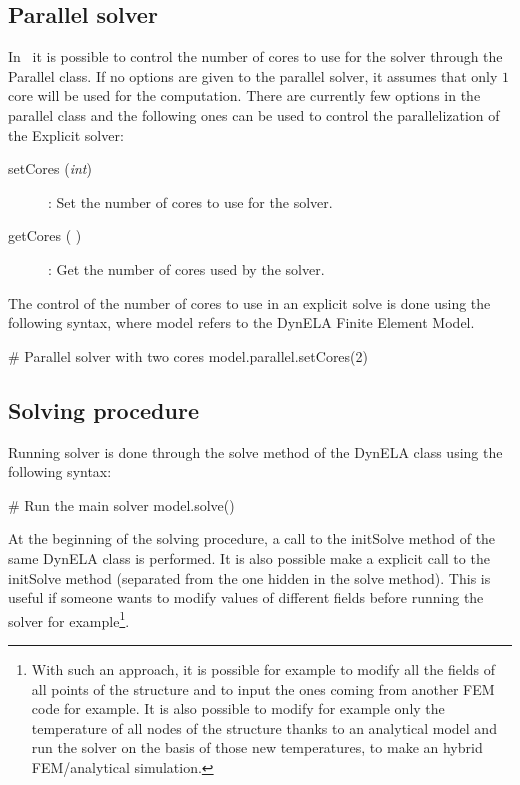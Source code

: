 \subsection{Parallel solver}
In \DynELA~it is possible to control the number of cores to use for the solver through the \textsf{Parallel} class. If no options are given to the parallel solver, it assumes that only $1$ core will be used for the computation. There are currently few options in the parallel class and the following ones can be used to control the parallelization of the Explicit solver:
\begin{description}
\item [{setCores (\emph{int})}] : Set the number of cores to use for the solver.
\item [{getCores ( )}] : Get the number of cores used by the solver.
\end{description}
The control of the number of cores to use in an explicit solve is done using the following syntax, where \textsf{model} refers to the DynELA Finite Element Model.
\begin{PythonListing}
# Parallel solver with two cores
model.parallel.setCores(2)
\end{PythonListing}

\subsection{Solving procedure}
Running solver is done through the \textsf{solve} method of the \textsf{DynELA} class using the following syntax:
\begin{PythonListing}
# Run the main solver
model.solve()
\end{PythonListing}
At the beginning of the solving procedure, a call to the \textsf{initSolve} method of the same \textsf{DynELA} class is performed. It is also possible make a explicit call to the \textsf{initSolve} method (\ie separated from the one hidden in the solve method). This is useful if someone wants to modify values of different fields before running the solver for example\footnote{With such an approach, it is possible for example to modify all the fields of all points of the structure and to input the ones coming from another FEM code for example. It is also possible to modify for example only the temperature of all nodes of the structure thanks to an analytical model and run the solver on the basis of those new temperatures, \ie to make an hybrid FEM/analytical simulation.}.

